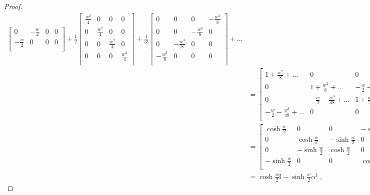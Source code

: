 \begin{example}
\begin{proof}
\begin{equation*}
\begin{aligned}
\begin{bmatrix}
                    0 & - \frac{w}{2} & 0 & 0 \\
                    - \frac{w}{2} & 0 & 0 & 0 \\
                \end{bmatrix} + \frac{1}{2} \begin{bmatrix}
                    \frac{w^2}{4} & 0 & 0 & 0\\
                    0 & \frac{w^2}{4} & 0 & 0 \\
                    0 & 0 & \frac{w^2}{4} & 0 \\
                    0 & 0 & 0 & \frac{w^2}{4} \\
                \end{bmatrix} + \frac{1}{3!} \begin{bmatrix}
                    0 & 0 & 0 & - \frac{w^3}{8} \\
                    0 & 0 & - \frac{w^3}{8} & 0 \\
                    0 & - \frac{w^3}{8} & 0 & 0 \\
                    - \frac{w^3}{8} & 0 & 0 & 0 \\
                \end{bmatrix} + \ldots \\ & = \begin{bmatrix}
                    1 + \frac{w^2}{8} + \ldots & 0 & 0 & - \frac{w}{2} - \frac{w^3}{48} + \ldots \\
                    0 & 1 + \frac{w^2}{8} + \ldots & - \frac{w}{2} - \frac{w^3}{48} + \ldots & 0 \\ 
                    0 & - \frac{w}{2} - \frac{w^3}{48} + \ldots & 1 + \frac{w^2}{8} + \ldots & 0 \\ 
                    - \frac{w}{2} - \frac{w^3}{48} + \ldots & 0 & 0 & 1 + \frac{w^2}{8} + \ldots \\ 
                \end{bmatrix} \\ & = \begin{bmatrix}
                    \cosh \frac{w}{2} & 0 & 0 & - \sinh \frac{w}{2} \\
                    0 & \cosh \frac{w}{2} & - \sinh \frac{w}{2} & 0 \\
                    0 & - \sinh \frac{w}{2} & \cosh \frac{w}{2} & 0 \\
                    - \sinh \frac{w}{2} & 0 & 0 & \cosh \frac{w}{2} \\
                \end{bmatrix} \\ & = \cosh \frac{w}{2} \mathbb I - \sinh \frac{w}{2} \alpha^1 ~,

\end{aligned}
\end{equation*}
\end{proof}
\end{example}
